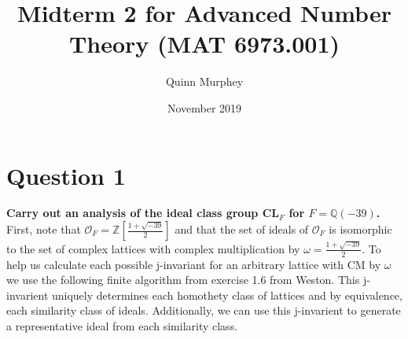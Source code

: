 \documentclass[12pt]{amsart}
\theoremstyle{definition}
\theoremstyle{remark}
\begin{document}
 
\renewcommand{\qedsymbol}{$\square$}
 
\title{Midterm 2 for Advanced Number Theory (MAT 6973.001)}
\author{Quinn Murphey}
\date{November 2019}
\maketitle

\section*{Question 1}
\textbf{Carry out an analysis of the ideal class group CL$_F$ for $F=\mathbb{Q}(-39)$.}\\

First, note that $\mathcal{O}_F = \mathbb{Z}[\frac{1+\sqrt{-39}}{2}]$ and that the set of ideals of $\mathcal{O}_F$ is isomorphic to the set of complex lattices with complex multiplication by $\omega = \frac{1+\sqrt{-39}}{2}$. To help us calculate each possible j-invariant for an arbitrary lattice with CM by $\omega$ we use the following finite algorithm from exercise 1.6 from Weston. This j-invarient uniquely determines each homothety class of lattices and by equivalence, each similarity class of ideals. Additionally, we can use this j-invarient to generate a representative ideal from each similarity class. 
\end{document}
